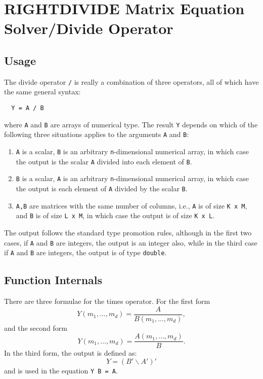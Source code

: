 \section{RIGHTDIVIDE Matrix Equation Solver/Divide Operator}

\subsection{Usage}

The divide operator \verb|/| is really a combination of three
operators, all of which have the same general syntax:
\begin{verbatim}
  Y = A / B
\end{verbatim}
where \verb|A| and \verb|B| are arrays of numerical type.  The result \verb|Y| depends
on which of the following three situations applies to the arguments
\verb|A| and \verb|B|:
\begin{enumerate}
\item  \verb|A| is a scalar, \verb|B| is an arbitrary \verb|n|-dimensional numerical array, in which case the output is the scalar \verb|A| divided into each element of \verb|B|.

\item  \verb|B| is a scalar, \verb|A| is an arbitrary \verb|n|-dimensional numerical array, in which case the output is each element of \verb|A| divided by the scalar \verb|B|.

\item  \verb|A,B| are matrices with the same number of columns, i.e., \verb|A| is of size \verb|K x M|, and \verb|B| is of size \verb|L x M|, in which case the output is of size \verb|K x L|.

\end{enumerate}
The output follows the standard type promotion rules, although in the first two cases, if \verb|A| and \verb|B| are integers, the output is an integer also, while in the third case if \verb|A| and \verb|B| are integers, the output is of type \verb|double|.

\subsection{Function Internals}

There are three formulae for the times operator.  For the first form
\[
Y(m_1,\ldots,m_d) = \frac{A}{B(m_1,\ldots,m_d)},
\]
and the second form
\[
Y(m_1,\ldots,m_d) = \frac{A(m_1,\ldots,m_d)}{B}.
\]
In the third form, the output is defined as:
\[
  Y = (B' \backslash A')'
\]
and is used in the equation \verb|Y B = A|.
